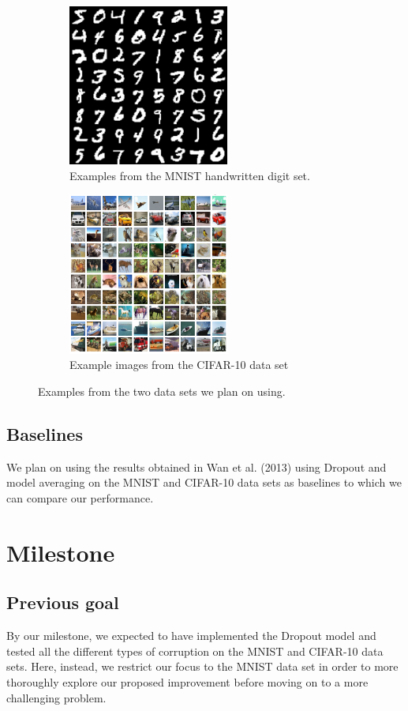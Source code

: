 \documentclass{article} %
\begin{document}
\begin{figure}
\centering
\begin{subfigure}{.5\textwidth}
  \centering
  \includegraphics[width=150pt]{MNIST_Image.png}
  \caption{Examples from the MNIST handwritten digit set.}
  \label{fig:mnist}
\end{subfigure}%
\begin{subfigure}{.5\textwidth}
  \centering
  \includegraphics[width=150pt]{CIFAR-10_Image.png}
  \caption{Example images from the CIFAR-10 data set}
  \label{fig:cifar10}
\end{subfigure}
\caption{Examples from the two data sets we plan on using.}
\label{fig:datasets}
\end{figure}

\subsection{Baselines}

We plan on using the results obtained in Wan et al. (2013) using Dropout and model averaging on the MNIST and CIFAR-10 data sets as baselines to which we can compare our performance.

\section{Milestone}

\subsection{Previous goal}
By our milestone, we expected to have implemented the Dropout model and tested all the different types of corruption on the MNIST and CIFAR-10 data sets. Here, instead,  we restrict our focus to the MNIST data set in order to more thoroughly explore our proposed improvement before moving on to a more challenging problem.
\end{document}
